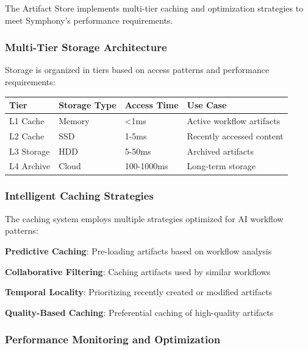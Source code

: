 The Artifact Store implements multi-tier caching and optimization strategies to meet Symphony's performance requirements.

\subsubsection*{Multi-Tier Storage Architecture}

Storage is organized in tiers based on access patterns and performance requirements:

\begin{center}
\begin{tabular}{@{}llll@{}}
\toprule
\textbf{Tier} & \textbf{Storage Type} & \textbf{Access Time} & \textbf{Use Case} \\
\midrule
L1 Cache & Memory & <1ms & Active workflow artifacts \\
L2 Cache & SSD & 1-5ms & Recently accessed content \\
L3 Storage & HDD & 5-50ms & Archived artifacts \\
L4 Archive & Cloud & 100-1000ms & Long-term storage \\
\bottomrule
\end{tabular}
\end{center}

\subsubsection*{Intelligent Caching Strategies}

The caching system employs multiple strategies optimized for AI workflow patterns:

\begin{expandedlist}
    \item \textbf{Predictive Caching}: Pre-loading artifacts based on workflow analysis
    \item \textbf{Collaborative Filtering}: Caching artifacts used by similar workflows
    \item \textbf{Temporal Locality}: Prioritizing recently created or modified artifacts
    \item \textbf{Quality-Based Caching}: Preferential caching of high-quality artifacts
\end{expandedlist}

\subsubsection*{Performance Monitoring and Optimization}

